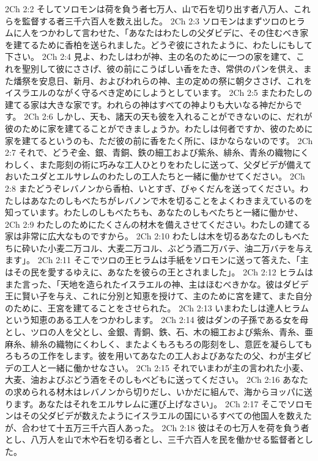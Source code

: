 2Ch 2:2  そしてソロモンは荷を負う者七万人、山で石を切り出す者八万人、これらを監督する者三千六百人を数え出した。
2Ch 2:3  ソロモンはまずツロのヒラムに人をつかわして言わせた、「あなたはわたしの父ダビデに、その住むべき家を建てるために香柏を送られました。どうぞ彼にされたように、わたしにもして下さい。
2Ch 2:4  見よ、わたしはわが神、主の名のために一つの家を建て、これを聖別して彼にささげ、彼の前にこうばしい香をたき、常供のパンを供え、また燔祭を安息日、新月、およびわれらの神、主の定めの祭に朝夕ささげ、これをイスラエルのながく守るべき定めにしようとしています。
2Ch 2:5  またわたしの建てる家は大きな家です。われらの神はすべての神よりも大いなる神だからです。
2Ch 2:6  しかし、天も、諸天の天も彼を入れることができないのに、だれが彼のために家を建てることができましょうか。わたしは何者ですか、彼のために家を建てるというのも、ただ彼の前に香をたく所に、ほかならないのです。
2Ch 2:7  それで、どうぞ金、銀、青銅、鉄の細工および紫糸、緋糸、青糸の織物にくわしく、また彫刻の術に巧みな工人ひとりをわたしに送って、父ダビデが備えておいたユダとエルサレムのわたしの工人たちと一緒に働かせてください。
2Ch 2:8  またどうぞレバノンから香柏、いとすぎ、びゃくだんを送ってください。わたしはあなたのしもべたちがレバノンで木を切ることをよくわきまえているのを知っています。わたしのしもべたちも、あなたのしもべたちと一緒に働かせ、
2Ch 2:9  わたしのためにたくさんの材木を備えさせてください。わたしの建てる家は非常に広大なものですから。
2Ch 2:10  わたしは木を切るあなたのしもべたちに砕いた小麦二万コル、大麦二万コル、ぶどう酒二万バテ、油二万バテを与えます」。
2Ch 2:11  そこでツロの王ヒラムは手紙をソロモンに送って答えた、「主はその民を愛するゆえに、あなたを彼らの王とされました」。
2Ch 2:12  ヒラムはまた言った、「天地を造られたイスラエルの神、主はほむべきかな。彼はダビデ王に賢い子を与え、これに分別と知恵を授けて、主のために宮を建て、また自分のために、王宮を建てることをさせられた。
2Ch 2:13  いまわたしは達人ヒラムという知恵のある工人をつかわします。
2Ch 2:14  彼はダンの子孫である女を母とし、ツロの人を父とし、金銀、青銅、鉄、石、木の細工および紫糸、青糸、亜麻糸、緋糸の織物にくわしく、またよくもろもろの彫刻をし、意匠を凝らしてもろもろの工作をします。彼を用いてあなたの工人およびあなたの父、わが主ダビデの工人と一緒に働かせなさい。
2Ch 2:15  それでいまわが主の言われた小麦、大麦、油およびぶどう酒をそのしもべどもに送ってください。
2Ch 2:16  あなたの求められる材木はレバノンから切りだし、いかだに組んで、海からヨッパに送ります。あなたはそれをエルサレムに運び上げなさい」。
2Ch 2:17  そこでソロモンはその父ダビデが数えたようにイスラエルの国にいるすべての他国人を数えたが、合わせて十五万三千六百人あった。
2Ch 2:18  彼はその七万人を荷を負う者とし、八万人を山で木や石を切る者とし、三千六百人を民を働かせる監督者とした。
